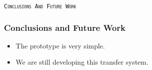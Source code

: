 \begin{frame}
    \begin{center}
        \LARGE \tt{{\textsc{Conclusions And Future Work}}}
    \end{center}
\end{frame}

\begin{frame}
    \frametitle{Conclusions and Future Work}
    \begin{itemize}
        \item The prototype is very simple.
        \item We are still developing this transfer system.
    \end{itemize}
\end{frame}

